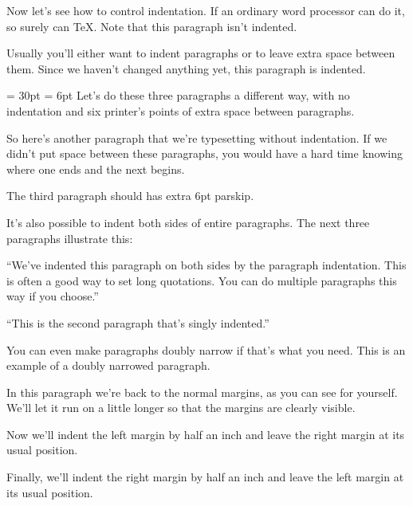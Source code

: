 \hsize=4in %
\everypar{\dag}%
\noindent Now let’s see how to control indentation. If an
ordinary word processor can do it, so surely can \TeX. Note
that this paragraph isn’t indented.

Usually you’ll either want to indent paragraphs or to leave
extra space between them. Since we haven’t changed anything
yet, this paragraph is indented.

{\parindent = 30pt \parskip = 6pt
    Let’s do these three paragraphs a different way,
    with no indentation and six printer’s points of extra space
    between paragraphs.

    So here’s another paragraph that we’re typesetting without
    indentation. If we didn’t put space between these paragraphs,
    you would have a hard time knowing where one ends
    and the next begins.

    The third paragraph should has extra 6pt parskip.
    \par %
}%
It’s also possible to indent both sides of entire paragraphs.
The next three paragraphs illustrate this:
\smallskip %
{\narrower
    ``We've indented this paragraph on both sides by the paragraph
    indentation. This is often a good way to set long quotations.
    You can do multiple paragraphs this way if you choose.''

    ``This is the second paragraph that’s singly indented.''\par}
{\narrower \narrower 
    You can even make paragraphs doubly narrow
    if that’s what you need. This is an example of a doubly
    narrowed paragraph.\par}
\vskip 1pc %
In this paragraph we’re back to the normal margins, as you can
see for yourself. We’ll let it run on a little longer so that
the margins are clearly visible.

{\leftskip -40pt Now we’ll indent the left margin by half
    an inch and leave the right margin at its usual position.\par}
{\rightskip 20pt Finally, we’ll indent the right margin by half
    an inch and leave the left margin at its usual position.\par}
\bye %

